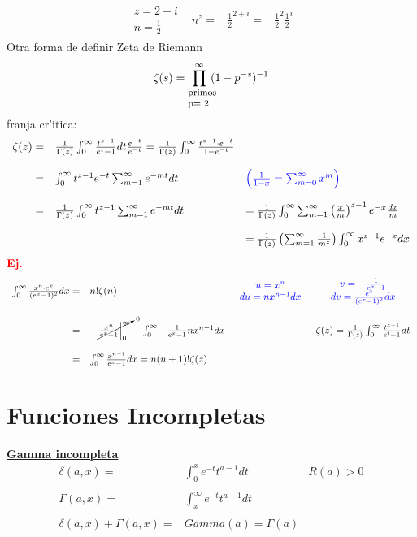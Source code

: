 \documentclass{article}
\theoremstyle{definition}
\begin{document}
\[
\begin{array}{lccc}
	\begin{array}{ll}
		z=2+i\\
		n=\frac{1}{2}
	\end{array} & n^z=&\frac{1}{2}^{2+i}=& \frac{1}{2}^2\frac{1}{2}^i
\end{array}
\]
Otra forma de definir Zeta de Riemann
\[\zeta (s)=\prod^{\infty}_{\parbox{2em}{\footnotesize primos p= 2}}(1-p^{-s})^{-1}\]
franja cr'itica:
\[
\begin{array}{rll}
	\zeta (z)=& \frac{1}{\Gamma (z)}\int^{\infty}_0\frac{t^{z-1}}{e^t-1}dt\frac{e^{-t}}{e^{-t}}=\frac{1}{\Gamma (z)}\int^{\infty}_0\frac{t^{z-1}\cdot e^{-t}}{1-e^{-t}}\\
	\\
	=& \int^{\infty}_0 t^{z-1}e^{-t}\sum^{\infty}_{m=1}e^{-mt}dt & \textcolor{blue}{\left(\frac{1}{1-x}=\sum^{\infty}_{m=0}x^m\right)}\\
	\\
	=& \frac{1}{\Gamma (z)} \int^{\infty}_0 t^{z-1} \sum^{\infty}_{m=1} e^{-mt}dt &=\frac{1}{\Gamma (z)}\int^{\infty}_0\sum^{\infty}_{m=1}\left(\frac{x}{m}\right)^{z-1}e^{-x}\frac{dx}{m}\\ 
	\\
	&&=\frac{1}{\Gamma (z)}\left(\sum^{\infty}_{m=1} \frac{1}{m^z}\right)\int^{\infty}_0x^{z-1}e^{-x}dx
\end{array}
\]
\textbf{\textcolor{red}{Ej.}}
\[
\begin{array}{rlcc}
	\int^{\infty}_0 \frac{x^n\cdot e^x}{(e^x-1)^2}dx=&n!\zeta (n) &\textcolor{blue}{\begin{array}{cc}
		u=x^n\\
		du=nx^{n-1}dx
	\end{array}}	& \textcolor{blue}{\begin{array}{cc}
		v=-\frac{1}{e^x-1}\\
		dv=\frac{e^x}{(e^x-1)^2}dx
	\end{array}}\\
	\\
	=&-\cancelto{0}{\left.\frac{x^n}{e^x-1}\right|^{\infty}_0}-\int^{\infty}_0-\frac{1}{e^x-1}nx^{n-1}dx&& \zeta (z)=\frac{1}{\Gamma (z)}\int^{\infty}_0 \frac{t^{z-1}}{e^t-1}dt\\
	\\
	=&\int^{\infty}_0 \frac{x^{n-1}}{e^x-1}dx=n(n+1)!\zeta (z)
\end{array}
\]
\section*{Funciones Incompletas}
\textbf{\underline{Gamma incompleta}}
\[
\begin{array}{rlr}
	\delta (a,x)=& \int^x_0e^{-t}t^{a-1}dt& R(a)>0\\
	\\
	\Gamma (a,x)=&\int^{\infty}_x e^{-t}t^{a-1}dt\\
	\\
	\delta (a,x)+ \Gamma (a,x)=& Gamma(a)=\Gamma (a)
\end{array}
\]
\end{document}
